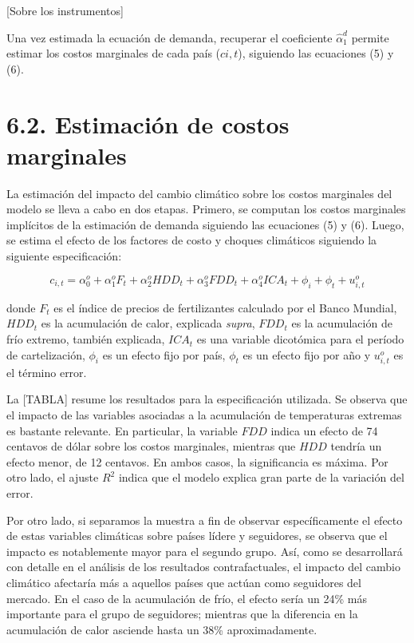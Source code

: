 

[Sobre los instrumentos]

Una vez estimada la ecuación de demanda, recuperar el coeficiente $\hat{\alpha}^{d}_{1}$ permite estimar los costos marginales de cada país ($c{i,t}$), siguiendo las ecuaciones (5) y (6).

\section*{6.2. Estimación de costos marginales}

La estimación del impacto del cambio climático sobre los costos marginales del modelo se lleva a cabo en dos etapas. Primero, se computan los costos marginales implícitos de la estimación de demanda siguiendo las ecuaciones (5) y (6). Luego, se estima el efecto de los factores de costo y choques climáticos siguiendo la siguiente especificación:

\begin{equation}
    c_{i,t} = \alpha^{o}_{0} + 
\alpha^{o}_{1}F_{t} +
\alpha^{o}_{2}HDD_{t} +
\alpha^{o}_{3}FDD_{t} +
\alpha^{o}_{4}ICA_{t} +
\phi_{i}+\phi_{t}+u^{o}_{i,t}
\end{equation} 

donde $F_{t}$ es el índice de precios de fertilizantes calculado por el Banco Mundial, $HDD_{t}$ es la acumulación de calor, explicada \textit{supra}, $FDD_{t}$ es la acumulación de frío extremo, también explicada, $ICA_{t}$ es una variable dicotómica para el período de cartelización, $\phi_{i}$ es un efecto fijo por país, $\phi_{t}$ es un efecto fijo por año y $u^{o}_{i,t}$ es el término error.

La [TABLA] resume los resultados para la especificación utilizada. Se observa que el impacto de las variables asociadas a la acumulación de temperaturas extremas es bastante relevante. En particular, la variable $FDD$ indica un efecto de 74 centavos de dólar sobre los costos marginales, mientras que $HDD$ tendría un efecto menor, de 12 centavos. En ambos casos, la significancia es máxima. Por otro lado, el ajuste $R^{2}$ indica que el modelo explica gran parte de la variación del error. 

Por otro lado, si separamos la muestra a fin de observar específicamente el efecto de estas variables climáticas sobre países lídere y seguidores, se observa que el impacto es notablemente mayor para el segundo grupo. Así, como se desarrollará con detalle en el análisis de los resultados contrafactuales, el impacto del cambio climático afectaría más a aquellos países que actúan como seguidores del mercado. En el caso de la acumulación de frío, el efecto sería un 24\% más importante para el grupo de seguidores; mientras que la diferencia en la acumulación de calor asciende hasta un 38\% aproximadamente.

